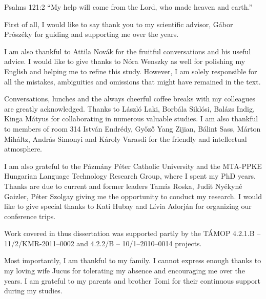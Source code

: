 \begin{chapquote}{Psalms 121:2}
``My help will come from the Lord, who made heaven and earth.''
\end{chapquote}

First of all, I would like to say thank you to my scientific advisor, Gábor Prószéky for guiding and supporting me over the years.

I am also thankful to Attila Novák for the fruitful conversations and his useful advice.
I would like to give thanks to Nóra Wenszky as well for polishing my English and helping me to refine this study.
However, I am solely responsible for all the mistakes, ambiguities and omissions that might have remained in the text.

Conversations, lunches and the always cheerful coffee breaks with my colleagues are greatly acknowledged. 
Thanks to László Laki, Borbála Siklósi, Balázs Indig, Kinga Mátyus for collaborating in numerous valuable studies.
I am also thankful to members of room 314 István Endrédy, Győző Yang Zijian, Bálint Sass, Márton Miháltz, András Simonyi and Károly Varasdi for the friendly and intellectual atmosphere.

I am also grateful to the Pázmány Péter Catholic University and the MTA-PPKE Hungarian Language Technology Research Group, where I spent my PhD years. 
Thanks are due to current and former leaders Tamás Roska, Judit Nyékyné Gaizler, Péter Szolgay giving me the opportunity to conduct my research.
I would like to give special thanks to Kati Hubay and Lívia Adorján for organizing our conference trips.

Work covered in thus dissertation was supported partly by the TÁMOP 4.2.1.B -- 11/2/KMR-2011–0002 and 4.2.2/B -- 10/1–2010–0014 projects.

Most importantly, I am thankful to my family.
I cannot express enough thanks to my loving wife Jucus for tolerating my  absence and encouraging me over the years.
I am grateful to my parents and brother Tomi for their continuous support during my studies.
